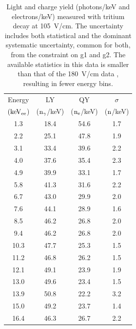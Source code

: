 \begin{table}[h!]
\centering
\caption{Light and charge yield (photons/keV and electrons/keV) measured with tritium decay at 105~V/cm. The uncertainty includes both statistical and the dominant systematic uncertainty, common for both, from the constraint on g1 and g2. The available statistics in this data is smaller than that of the 180~V/cm data , resulting in fewer energy bins.}
\begin{tabular}{|c|c|c|c|} \hline
Energy 	& 		LY	& 	QY	& $\sigma$ \\ 
$\rm (keV_{ee}$) & ($\rm n_\gamma$/keV)   & ($\rm n_e$/keV) & ($\rm n$/keV) \\ \hline
1.3 	 & 18.4 	 & 54.6 	 & 1.7 	 \\ \hline 
2.2 	 & 25.1 	 & 47.8 	 & 1.9 	 \\ \hline 
3.1 	 & 33.4 	 & 39.6 	 & 2.2 	 \\ \hline 
4.0 	 & 37.6 	 & 35.4 	 & 2.3 	 \\ \hline 
4.9 	 & 39.9 	 & 33.1 	 & 1.7 	 \\ \hline 
5.8 	 & 41.3 	 & 31.6 	 & 2.2 	 \\ \hline 
6.7 	 & 43.0 	 & 29.9 	 & 2.0 	 \\ \hline 
7.6 	 & 44.1 	 & 28.9 	 & 1.6 	 \\ \hline 
8.5 	 & 46.2 	 & 26.8 	 & 2.0 	 \\ \hline 
9.4 	 & 46.2 	 & 26.8 	 & 2.0 	 \\ \hline 
10.3 	 & 47.7 	 & 25.3 	 & 1.5 	 \\ \hline 
11.2 	 & 46.8 	 & 26.2 	 & 1.5 	 \\ \hline 
12.1 	 & 49.1 	 & 23.9 	 & 1.9 	 \\ \hline 
13.0 	 & 49.6 	 & 23.4 	 & 1.5 	 \\ \hline 
13.9 	 & 50.8 	 & 22.2 	 & 3.2 	 \\ \hline 
15.0 	 & 49.2 	 & 23.7 	 & 1.4 	 \\ \hline 
16.4 	 & 46.3 	 & 26.7 	 & 2.2 	 \\ \hline 
\end{tabular}
\label{table:Yields_100}
\end{table}



